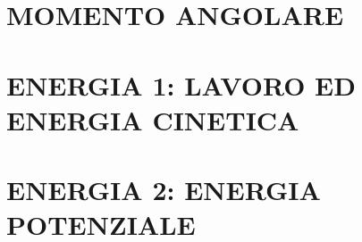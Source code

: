 \documentclass{article}
\begin{document}
	\section{MOMENTO ANGOLARE}
		\begin{multicols}{2}
\begin{comment}
			\begin{equation}  \end{equation}
			\begin{equation}  \end{equation}
			\begin{equation}  \end{equation}
			\begin{equation}  \end{equation}
\end{comment}
		\end{multicols}
	\section{ENERGIA 1: LAVORO ED ENERGIA CINETICA}
		\begin{multicols}{2}
\begin{comment}
			\begin{equation}  \end{equation}
			\begin{equation}  \end{equation}
			\begin{equation}  \end{equation}
			\begin{equation}  \end{equation}
\end{comment}
		\end{multicols}
	\section{ENERGIA 2: ENERGIA POTENZIALE}
		\begin{multicols}{2}
\begin{comment}
			\begin{equation}  \end{equation}
			\begin{equation}  \end{equation}
			\begin{equation}  \end{equation}
			\begin{equation}  \end{equation}
\end{comment}
		\end{multicols}
\end{document}
